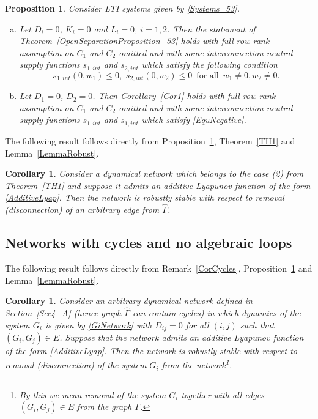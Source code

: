 \documentclass[11pt,a4paper,oneside,DIV=12,headings=small]{scrartcl}
\newtheorem{proposition}[theorem]{Proposition}
\newtheorem{corollary}[theorem]{Corollary}
\theoremstyle{plain}
\begin{document}
\begin{proposition}
\label{Robust}
Consider LTI systems given by \eqref{Systems_53}.
\begin{enumerate}[(a)]
\item  Let $D_i=0$, $K_i=0$ and $L_i=0$, $i=1,2$. 
Then the statement of Theorem~\ref{OpenSeparationProposition_53} holds with full row rank assumption on $C_1$ and $C_2$ omitted and with some interconnection neutral supply functions $s_{1,int}$ and $s_{2,int}$ which satisfy the following condition
\begin{equation}
\label{EquNegative}
s_{1,int}(0,w_1)\leq 0,\,\, s_{2,int}(0,w_2)\leq 0 \,\,\, \text{for all} \, \,\, w_1\neq 0, w_2\neq 0. 
\end{equation}
\item Let $D_1=0$, $D_2=0$. Then Corollary~\ref{Cor1}  holds with full row rank assumption on $C_1$ and $C_2$ omitted and with some interconnection neutral supply functions $s_{1,int}$ and $s_{1,int}$ which satisfy \eqref{EquNegative}.
\end{enumerate}
\end{proposition}
 

The following result follows directly from Proposition~\ref{Robust}, Theorem~\ref{TH1} and Lemma~\ref{LemmaRobust}.

\begin{corollary}
\label{CorROB}
Consider a dynamical network which belongs to the case (2) from Theorem~\ref{TH1} and suppose it admits an additive Lyapunov function of the form  \eqref{AdditiveLyap}. Then the network is robustly stable with respect to removal (disconnection) of an arbitrary edge from $\hat{\Gamma}$.
\end{corollary}

\subsection{Networks with cycles and no algebraic loops}

The following result follows directly from Remark~\ref{CorCycles}, Proposition~\ref{Robust} and Lemma~\ref{LemmaRobust}.
\begin{corollary}
\label{CorROBcycles}
Consider an arbitrary dynamical network defined in Section~\ref{Sec4_A} (hence graph $\hat{\Gamma}$ can contain cycles) in which dynamics of the system $G_i$ is given by \eqref{GiNetwork} with $D_{ij}=0$ for all $(i,j)$ such that $(G_i,G_j)\in E$. Suppose that the network admits an additive Lyapunov function of the form  \eqref{AdditiveLyap}. Then the network is robustly stable with respect to removal (disconnection) of the system $G_i$ from the network\footnote{By this we mean removal of the system $G_i$ together with all edges $(G_i,G_j)\in E$ from the graph $\Gamma$.}.  
\end{corollary}
\end{document}
